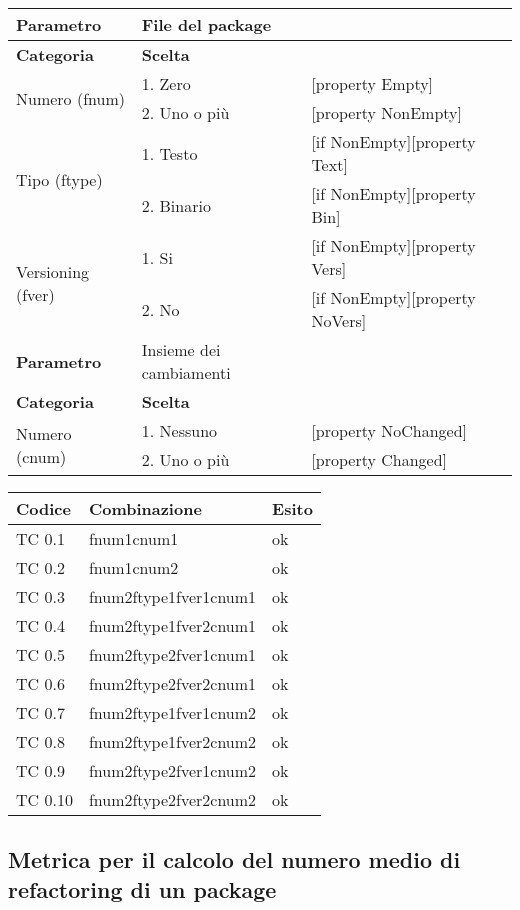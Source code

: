 \begin{tabular}{|p{4cm}|p{4cm}p{5cm}|}
	\hline
	\cellcolor{Gray} \textbf{Parametro}		& File del package		&							\tabularnewline
	\hline
	\rowcolor{Gray}
	\textbf{Categoria} 				& \textbf{Scelta}		&							\tabularnewline
	\hline
	\multirow{2}{*}{Numero (fnum)} 			& 1. Zero 			& [property Empty] 					\tabularnewline
	\cline{2-3}
							& 2. Uno o più			& [property NonEmpty]					\tabularnewline
	\hline
	\multirow{2}{*}{Tipo (ftype)} 			& 1. Testo			& [if NonEmpty][property Text] 				\tabularnewline
	\cline{2-3}
							& 2. Binario			& [if NonEmpty][property Bin]				\tabularnewline
	\hline
	\multirow{2}{*}{Versioning (fver)}		& 1. Si				& [if NonEmpty][property Vers]				\tabularnewline
	\cline{2-3}
							& 2. No				& [if NonEmpty][property NoVers]			\tabularnewline
	\hline
	\cellcolor{Gray} \textbf{Parametro}		& Insieme dei cambiamenti	&							\tabularnewline
	\hline
	\rowcolor{Gray}
	\textbf{Categoria} 				& \textbf{Scelta}		&							\tabularnewline
	\hline
	\multirow{2}{*}{Numero (cnum)} 			& 1. Nessuno 			& [property NoChanged]					\tabularnewline
	\cline{2-3}
							& 2. Uno o più			& [property Changed]					\tabularnewline
	\hline
\end{tabular}

\vspace{1cm}

\begin{tabular}{|p{3cm}|p{7cm}|p{3cm}|}
	  \hline
	  \rowcolor{Gray}
	  \textbf{Codice} & \textbf{Combinazione} & \textbf{Esito}\tabularnewline
	  \hline
	  TC 0.1			& fnum1cnum1 			& ok \tabularnewline
	  \hline
	  TC 0.2 			& fnum1cnum2 			& ok \tabularnewline
	  \hline
	  TC 0.3 			& fnum2ftype1fver1cnum1 	& ok \tabularnewline
	  \hline
	  TC 0.4 			& fnum2ftype1fver2cnum1 	& ok \tabularnewline
	  \hline
	  TC 0.5 			& fnum2ftype2fver1cnum1 	& ok \tabularnewline
	  \hline
	  TC 0.6 			& fnum2ftype2fver2cnum1		& ok \tabularnewline
	  \hline
	  TC 0.7 			& fnum2ftype1fver1cnum2 	& ok \tabularnewline
	  \hline
	  TC 0.8			& fnum2ftype1fver2cnum2 	& ok \tabularnewline
	  \hline
	  TC 0.9			& fnum2ftype2fver1cnum2 	& ok \tabularnewline
	  \hline
	  TC 0.10 			& fnum2ftype2fver2cnum2 	& ok \tabularnewline
	  \hline
\end{tabular}
\clearpage




\subsection{Metrica per il calcolo del numero medio di refactoring di un package}

